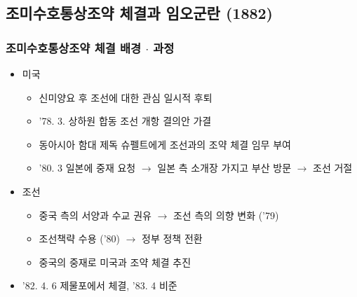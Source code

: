 \subsection{조미수호통상조약 체결과 임오군란 (1882)}

\subsubsection*{조미수호통상조약 체결 배경 $\cdot$ 과정}
\begin{itemize}
    \item 미국
    \begin{itemize}
        \item 신미양요 후 조선에 대한 관심 일시적 후퇴
        \item '78. 3. 상하원 합동 조선 개항 결의안 가결
        \item 동아시아 함대 제독 슈펠트에게 조선과의 조약 체결 임무 부여
        \item '80. 3 일본에 중재 요청 $\rightarrow$ 일본 측 소개장 가지고 부산 방문 $\rightarrow$ 조선 거절
    \end{itemize}
    \pagebreak
    \item 조선
    \begin{itemize}
        \item 중국 측의 서양과 수교 권유 $\rightarrow$ 조선 측의 의향 변화 ('79)
        \item 조선책략 수용 ('80) $\rightarrow$ 정부 정책 전환
        \item 중국의 중재로 미국과 조약 체결 추진
    \end{itemize}
    \item '82. 4. 6 제물포에서 체결, '83. 4 비준
\end{itemize}

